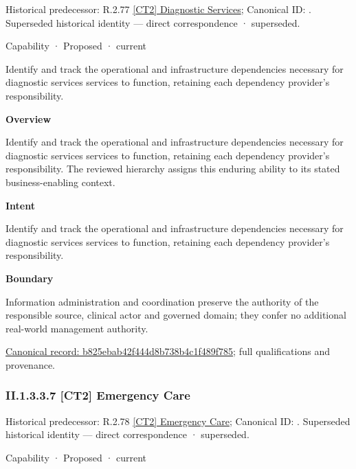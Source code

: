 {\small Historical predecessor: R.2.77 \hyperref[element:03a57e0c9ea34f7fb7b78e5f5c85379f]{[CT2] Diagnostic Services}; Canonical ID: \texttt{}. Superseded historical identity — direct correspondence · superseded.}\par
\label{element:b825ebab42f444d8b738b4c1f489f785}
{\small Capability · Proposed · current}\par

Identify and track the operational and infrastructure dependencies necessary for diagnostic services services to function, retaining each dependency provider's responsibility.



\textbf{Overview}



Identify and track the operational and infrastructure dependencies necessary for diagnostic services services to function, retaining each dependency provider's responsibility. The reviewed hierarchy assigns this enduring ability to its stated business-enabling context.



\textbf{Intent}



Identify and track the operational and infrastructure dependencies necessary for diagnostic services services to function, retaining each dependency provider's responsibility.



\textbf{Boundary}



Information administration and coordination preserve the authority of the responsible source, clinical actor and governed domain; they confer no additional real-world management authority.


{\footnotesize \href{../../../../../../../continuum/strategy/capability/b825ebab42f444d8b738b4c1f489f785.md}{Canonical record: b825ebab42f444d8b738b4c1f489f785}; full qualifications and provenance.}\par
\subsubsection*{II.1.3.3.7 [CT2] Emergency Care}
\label{navigation:II.1.3.3.7}

{\small Historical predecessor: R.2.78 \hyperref[element:e5edbb54258c490aaba0816d980dc624]{[CT2] Emergency Care}; Canonical ID: \texttt{}. Superseded historical identity — direct correspondence · superseded.}\par
\label{element:aa088f0647ad4b78966fe28fa80af674}
{\small Capability · Proposed · current}\par

